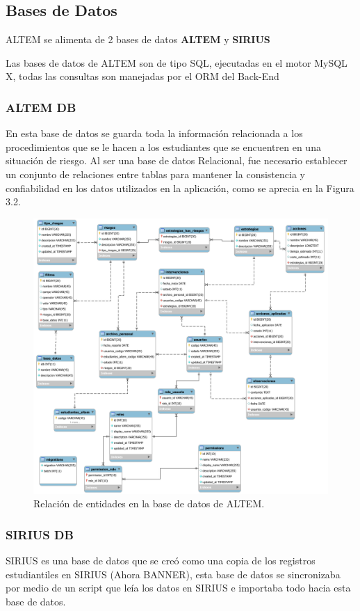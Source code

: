 \subsection{Bases de Datos}
ALTEM se alimenta de 2 bases de datos \textbf{ALTEM} y \textbf{SIRIUS}

Las bases de datos de ALTEM son de tipo SQL, ejecutadas en el motor MySQL X, todas las consultas son manejadas por el ORM del Back-End

\subsubsection{ALTEM DB}
En esta base de datos se guarda toda la información relacionada a los procedimientos que se le hacen a los estudiantes que se encuentren en una situación de riesgo.
Al ser una base de datos Relacional, fue necesario establecer un conjunto de relaciones entre tablas para mantener la consistencia y confiabilidad en los datos utilizados en la aplicación, como se aprecia en la Figura 3.2.

\begin{figure}[H]
    \centering
    \includegraphics[width=1\textwidth]{img/EER.png}
    \caption{Relación de entidades en la base de datos de ALTEM.}
\end{figure}

\subsubsection{SIRIUS DB}
SIRIUS es una base de datos que se creó como una copia de los registros estudiantiles en SIRIUS (Ahora BANNER), esta base de datos se sincronizaba por medio de un script que leía los datos en SIRIUS e importaba todo hacia esta base de datos.

